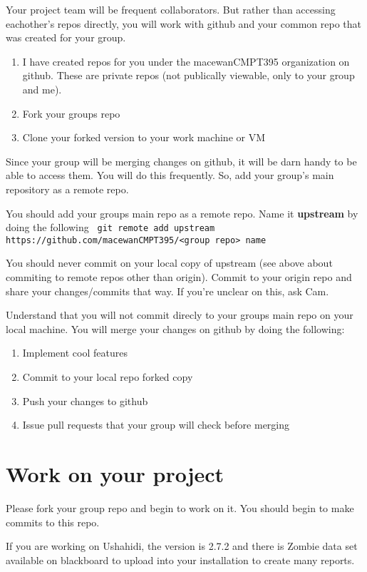 \documentclass[letterpaper]{article}
\begin{document}
Your project team will be frequent collaborators. But rather than accessing eachother's repos directly, you will work with github and your common repo that was created for your group.

\begin{enumerate}
\item I have created repos for you under the macewanCMPT395 organization on github.
These are private repos (not publically viewable, only to your group and me).
\item Fork your groups repo 
\item Clone your forked version to your work machine or VM
\end{enumerate}

Since your group will be merging changes on github, it will be darn handy to
be able to access them.  You will do this frequently.  So, add your group's
main repository as a remote repo.

You should add your groups main repo as a remote repo.  Name it {\bf upstream}
by doing the following \verb+ git remote add upstream https://github.com/macewanCMPT395/<group repo> name+

You should never commit on your local copy of upstream (see above about commiting to remote repos other than origin).  Commit to your origin repo and share your changes/commits that way.  If you're unclear on this, ask Cam.

Understand that you will not commit direcly to your groups main repo on your local
machine.  You will merge your changes on github by doing the following:

\begin{enumerate}
\item Implement cool features
\item Commit to your local repo forked copy
\item Push your changes to github 
\item Issue pull requests that your group will check before merging
\end{enumerate}


\section*{Work on your project}

Please fork your group repo and begin to work on it.  You should begin to make
commits to this repo.

If you are working on Ushahidi, the version is 2.7.2 and there is Zombie data
set available on blackboard to upload into your installation to create many reports.
\end{document}
